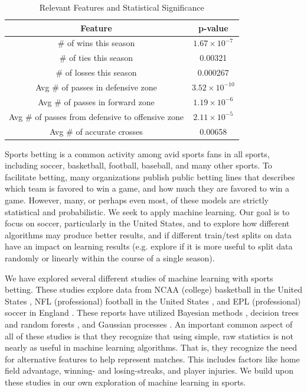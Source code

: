 \begin{table}[t]
        \centering
        \begin{tabular}[h]{|c|c|}
        \hline
        Feature & p-value \\ \hline \hline
        \# of wins this season & $1.67\times 10^{-7}$ \\
        \# of ties this season & 0.00321 \\
        \# of losses this season & 0.000267 \\
        Avg \# of passes in defensive zone & $3.52\times 10^{-10}$ \\
        Avg \# of passes in forward zone & $1.19\times 10^{-6}$ \\ 
        Avg \# of passes from defensive to offensive zone & $2.11\times 10^{-5}$ \\
        Avg \# of accurate crosses & 0.00658 \\ \hline
        \end{tabular}
        \caption{Relevant Features and Statistical Significance}
        \label{table0}
\end{table}

Sports betting is a common activity among avid sports fans in all sports, including soccer, basketball, football, baseball, and many other sports. To facilitate betting, many organizations publish public betting lines that describes which team is favored to win a game, and how much they are favored to win a game. However, many, or perhaps even most, of these models are strictly statistical and probabilistic. We seek to apply machine learning. Our goal is to focus on soccer, particularly in the United States, and to explore how different algorithms may produce better results, and if different train/test splits on data have an impact on learning results (e.g. explore if it is more useful to split data randomly or linearly within the course of a single season).

We have explored several different studies of machine learning with sports betting. These studies explore data from NCAA (college) basketball in the United States \cite{zimmermann2013predicting}, NFL (professional) football in the United States \cite{warner2010predicting}, and EPL (professional) soccer in England \cite{constantinou2012pi}. These reports have utilized Bayesian methods \cite{constantinou2012pi, zimmermann2013predicting}, decision trees and random forests \cite{zimmermann2013predicting}, and Gaussian processes \cite{warner2010predicting}. An important common aspect of all of these studies is that they recognize that using simple, raw statistics is not nearly as useful in machine learning algorithms. That is, they recognize the need for alternative features to help represent matches. This includes factors like home field advantage, winning- and losing-streaks, and player injuries. We build upon these studies in our own exploration of machine learning in sports.


